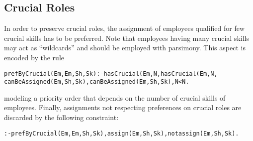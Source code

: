 \documentclass{tlp}
\begin{document}
\subsection{Crucial Roles}\label{subsec:crucial}
In order to preserve crucial roles, the assignment of employees
qualified for few crucial skills has to be preferred.
Note that employees having many crucial skills may act as ``wildcards''
and should be employed with parsimony.
This aspect is encoded by the rule
\begin{alltt}\small
 prefByCrucial(Em,Em,Sh,Sk) :- hasCrucial(Em,N, hasCrucial(Em,N,
    canBeAssigned(Em,Sh,Sk), canBeAssigned(Em,Sh,Sk), N < N.
\end{alltt}\normalsize
modeling a priority order that depends on the number of crucial skills of employees.
Finally, assignments not respecting preferences on crucial roles
are discarded by the following constraint:
\begin{alltt}\small
 :- prefByCrucial(Em,Em,Sh,Sk), assign(Em,Sh,Sk), not assign(Em,Sh,Sk).
\end{alltt}\normalsize
\end{document}
